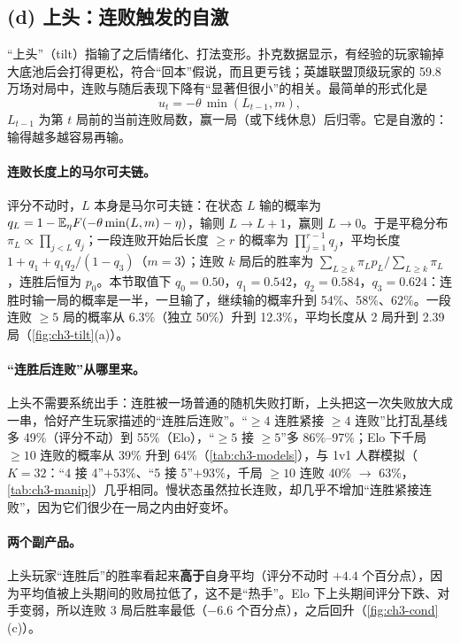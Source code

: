 \subsection{(d) 上头：连败触发的自激}
\label{sec:ch3-tilt}

“上头”（tilt）指输了之后情绪化、打法变形。扑克数据显示，有经验的玩家输掉大底池后会打得更松，符合“回本”假说，而且更亏钱\cite{smith2009poker}\tagLit\needcheck[，仅依据摘要]；英雄联盟顶级玩家的 59.8 万场对局中，连败与随后表现下降有“显著但很小”的相关\cite{deng2024streaks}\tagLit\needcheck[，仅依据摘要]。最简单的形式化是
\begin{equation}
u_t=-\theta\,\min(L_{t-1},m),
\label{eq:ch3-tilt}
\end{equation}
$L_{t-1}$ 为第 $t$ 局前的当前连败局数，赢一局（或下线休息）后归零。它是自激的：输得越多越容易再输。

\paragraph{连败长度上的马尔可夫链。} 评分不动时，$L$ 本身是马尔可夫链：在状态 $L$ 输的概率为 $q_L=1-\mathbb{E}_\eta F(-\theta\min(L,m)-\eta)$，输则 $L\to L+1$，赢则 $L\to0$。于是平稳分布 $\pi_L\propto\prod_{j<L}q_j$；一段连败开始后长度 $\ge r$ 的概率为 $\prod_{j=1}^{r-1}q_j$，平均长度 $1+q_1+q_1q_2/(1-q_3)$（$m=3$）；连败 $k$ 局后的胜率为 $\sum_{L\ge k}\pi_Lp_L/\sum_{L\ge k}\pi_L$，连胜后恒为 $p_0$。本节取值下 $q_0=0.50$，$q_1=0.542$，$q_2=0.584$，$q_3=0.624$：连胜时输一局的概率是一半，一旦输了，继续输的概率升到 54\%、58\%、62\%。一段连败 $\ge5$ 局的概率从 6.3\%（独立 50\%）升到 12.3\%，平均长度从 2 局升到 2.39 局（\cref{fig:ch3-tilt}(a)）\tagOwn{}。

\paragraph{“连胜后连败”从哪里来。} 上头不需要系统出手：连胜被一场普通的随机失败打断，上头把这一次失败放大成一串，恰好产生玩家描述的“连胜后连败”。“$\ge4$ 连胜紧接 $\ge4$ 连败”比打乱基线多 49\%（评分不动）到 55\%（Elo），“$\ge5$ 接 $\ge5$”多 86\%–97\%；Elo 下千局 $\ge10$ 连败的概率从 39\% 升到 64\%（\cref{tab:ch3-models}），与 1v1 人群模拟（$K=32$：“4 接 4”$+53\%$、“5 接 5”$+93\%$，千局 $\ge10$ 连败 40\% $\to$ 63\%，\cref{tab:ch3-manip}）几乎相同\tagOwn{}。慢状态虽然拉长连败，却几乎不增加“连胜紧接连败”，因为它们很少在一局之内由好变坏。

\paragraph{两个副产品。} 上头玩家“连胜后”的胜率看起来\textbf{高于}自身平均（评分不动时 $+4.4$ 个百分点），因为平均值被上头期间的败局拉低了，这不是“热手”。Elo 下上头期间评分下跌、对手变弱，所以连败 3 局后胜率最低（$-6.6$ 个百分点），之后回升（\cref{fig:ch3-cond}(c)）。

